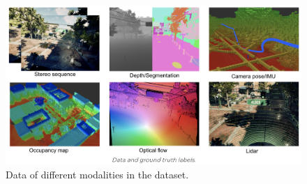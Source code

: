 \begin{figure}[h]
\centering
\includegraphics[width=\linewidth]{Figure/dataset_samples.png}
\caption{
    Data of different modalities in the dataset.
}
\label{fig:dataset-samples}
\end{figure}
